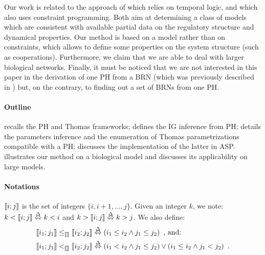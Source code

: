 Our work is related to the approach of \cite{Khalis09} which relies on temporal logic, and \cite{20646302,DBLP:conf/ipcat/CorblinFTCT12} which also uses constraint programming.
Both aim at determining a class of models which are consistent with available partial data on the regulatory structure and dynamical properties.
Our method is based on a model rather than on constraints, which allows to define some properties on the system structure (such as cooperations).
Furthermore, we claim that we are able to deal with larger biological networks.
Finally, it must be noticed that we are not interested in this paper in the derivation of one PH
from a BRN (which was previously described in \cite{PMR10-TCSB}) but, on the contrary, to finding
out a set of BRNs from one PH.

%
%

\paragraph{Outline}
 recalls the PH and Thomas frameworks;
 defines the IG inference from PH;
 details the parameters inference and the enumeration of Thomas parametrizations compatible with a PH;
 discusses the implementation of the latter in ASP.
 illustrates our method on a biological model
and discusses its applicability on large models.

\paragraph{Notations}
$\llbracket i ; j \rrbracket$ is the set of integers $\{ i, i+1, \dots, j \}$.
Given an integer $k$, we note: $k < \llbracket i ; j \rrbracket \stackrel{\Delta}\Leftrightarrow k < i$ and $k > \llbracket i ; j \rrbracket \stackrel{\Delta}\Leftrightarrow k > j$.
We also define:
\begin{align*}
  \llbracket i_1 ; j_1 \rrbracket \leq_{\llbracket\rrbracket} \llbracket i_2 ; j_2 \rrbracket &\stackrel{\Delta}\Leftrightarrow (i_1\leq i_2\wedge j_1\leq j_2) \enspace\text{, and:}\\
  \llbracket i_1 ; j_1 \rrbracket <_{\llbracket\rrbracket} \llbracket i_2 ; j_2 \rrbracket &\stackrel{\Delta}\Leftrightarrow (i_1<i_2 \wedge j_1\leq j_2) \vee (i_1\leq i_2\wedge j_1 < j_2) \enspace.
\end{align*}
